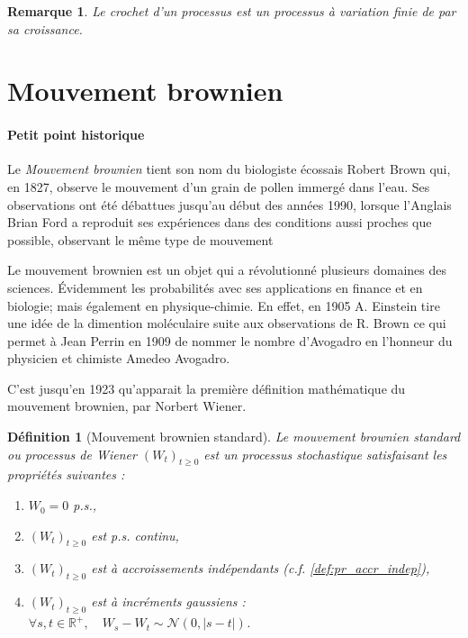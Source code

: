 \documentclass[openany]{book}
\newcommand{\R}{\mathbb{R}}
\newcommand{\1}{\mathbbm{1}}
\theoremstyle{thmfont}
\theoremstyle{deffont}
\newtheorem{definition}[definition]{Définition}
\theoremstyle{thmfont}
\theoremstyle{deffont}
\newtheorem{remark}[remark]{Remarque}
\begin{document}
\begin{remark}
  Le crochet d'un processus est un processus à variation finie de par sa croissance.
\end{remark}

\section{Mouvement brownien}
\paragraph{Petit point historique}
Le \textit{Mouvement brownien} tient son nom du biologiste écossais Robert Brown qui, en 1827, observe le mouvement d'un grain de pollen immergé dans l'eau. Ses observations ont été débattues jusqu’au début des années 1990, lorsque l’Anglais Brian Ford a reproduit ses expériences dans des conditions aussi proches que possible, observant le même type de mouvement


Le mouvement brownien est un objet qui a révolutionné plusieurs domaines des sciences. Évidemment les probabilités avec ses applications en finance et en biologie; mais également en physique-chimie. En effet, en 1905 A. Einstein tire une idée de la dimention moléculaire suite aux observations de R. Brown ce qui permet à Jean Perrin en 1909 de nommer le nombre d'Avogadro en l'honneur du physicien et chimiste Amedeo Avogadro.


C'est jusqu'en 1923 qu'apparait la première définition mathématique du mouvement brownien, par Norbert Wiener.\\

\begin{definition}[Mouvement brownien standard]  \label{def:MvtBorwnien}
  Le \textit{mouvement brownien standard} ou \textit{processus de Wiener} $(W_t)_{t\geq0}$ est un processus stochastique satisfaisant les propriétés suivantes :
  \begin{enumerate}
  \item $W_0 = 0$ p.s.,
  \item $(W_t)_{t\geq0}$ est p.s. continu,
  \item $(W_t)_{t\geq0}$ est à accroissements indépendants (c.f. \autoref{def:pr_accr_indep}),
  \item $(W_t)_{t \geq 0}$ est à incréments gaussiens : $\forall s, t \in \R^+,\quad W_s - W_t \sim \mathcal{N}(0,|s-t|)$.
  \end{enumerate}
\end{definition}
\end{document}
